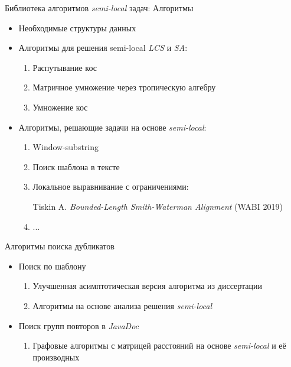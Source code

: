 \documentclass[xcolor=table]{beamer}
\begin{document}
\begin{frame}{Библиотека алгоритмов \emph{semi-local} задач: Алгоритмы}
\begin{itemize}
    \vfill\item Необходимые структуры данных
    \vfill\item Алгоритмы для решения semi-local \emph{LCS} и \emph{SA}:
    \begin{enumerate}
        \vfill\item Распутывание кос
        \vfill\item Матричное умножение через тропическую алгебру
        \vfill\item Умножение кос
    \end{enumerate}
    \vfill\item Алгоритмы, решающие задачи на основе \emph{semi-local}:
    \begin{enumerate}
        \vfill\item Window-substring
        \vfill\item Поиск шаблона в тексте
        \vfill\item Локальное выравнивание с ограничениями:
        \begin{flushright}
            Tiskin A. \emph{Bounded-Length Smith-Waterman Alignment} (WABI 2019) 
    \end{flushright}
    \vfill\item ...
    \end{enumerate}
\end{itemize}
\end{frame}



\begin{frame}{Алгоритмы поиска дубликатов}
\begin{itemize}
    \item Поиск по шаблону
    \begin{enumerate}
        \vfill\item Улучшенная асимптотическая версия алгоритма из диссертации
        \vfill\item Алгоритмы на основе анализа решения \emph{semi-local}
    \end{enumerate}
    \vfill\item Поиск групп повторов в \emph{JavaDoc}
    \begin{enumerate}
        \vfill \item Графовые алгоритмы с матрицей расстояний на основе \emph{semi-local} и её производных 
    \end{enumerate}
\end{itemize}
    
\end{frame}
\end{document}
